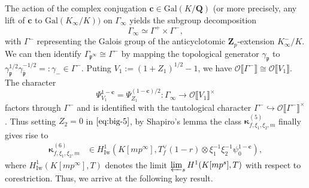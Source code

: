 \documentclass[10pt,letterpaper]{amsart}
\theoremstyle{plain}
\theoremstyle{definition}
\theoremstyle{definition}
\theoremstyle{plain}
\theoremstyle{plain}
\theoremstyle{plain}
\theoremstyle{remark}
\numberwithin{equation}{section}
\newcommand{\cc}{\mathbf{c}}
\newcommand{\pp}{\mathfrak{p}}
\newcommand{\ppbar}{\bar{\mathfrak{p}}}
\def\cO{\mathcal O}
\newcommand{\Q}{\mathbf{Q}}
\newcommand{\Z}{\mathbf{Z}}
\newcommand{\dBr}[1]{\llbracket{#1}\rrbracket}
\begin{document}
The action of the complex conjugation $\cc\in{\mathrm{Gal}}(K/\Q)$ (or more precisely, any lift of $\cc$ to ${\mathrm{Gal}}(K_\infty/K))$  on $\Gamma_\infty$ yields the subgroup decomposition
\[
\Gamma_\infty\simeq \Gamma^+\times\Gamma^-,
\]
with $\Gamma^-$ representing the Galois group of the anticyclotomic $\Z_p$-extension $K_\infty^-/K$. We can then identify $\Gamma_{\pp^\infty}\cong \Gamma^-$  by mapping the topological generator $\gamma_\pp$ to $\gamma_\pp^{1/2}\gamma_{\ppbar}^{-1/2}=:\gamma_-\in\Gamma^-$. Puting $V_1:=(1+Z_1)^{1/2}-1$, we have $\cO\dBr{\Gamma^-}\cong\cO\dBr{V_1}$. The character
\[
\Psi_{V_1}^{1-\cc}=\Psi_{Z_1}^{(1-\cc)/2}:\Gamma_\infty\rightarrow\cO\dBr{V_1}^\times
\]
factors through $\Gamma^-$ and is identified with the tautological character $\Gamma^-\hookrightarrow\cO\dBr{\Gamma^-}^\times$. Thus setting $Z_2=0$ in $\eqref{eq:big-5}$, by Shapiro's lemma the class $\boldsymbol{\kappa}_{f,\xi_1,\xi_2,m}^{(5)}$ finally gives rise to
\begin{equation}\label{eq:big-6}
\begin{aligned}
\boldsymbol{\kappa}_{f,\xi_1,\xi_2,m}^{(6)}&\in
H^1_{\mathrm{Iw}}(K[mp^\infty],T_f^\vee(1-r)\otimes\xi_1^{-1}\xi_2^{-1}\psi_0^{1-\cc}),
\end{aligned}
\end{equation}
where $H^1_{\mathrm{Iw}}(K[mp^\infty],T)$ denotes the limit $\varprojlim_sH^1(K[mp^s],T)$ with respect to corestriction. Thus, we arrive at the following key result.
\end{document}
